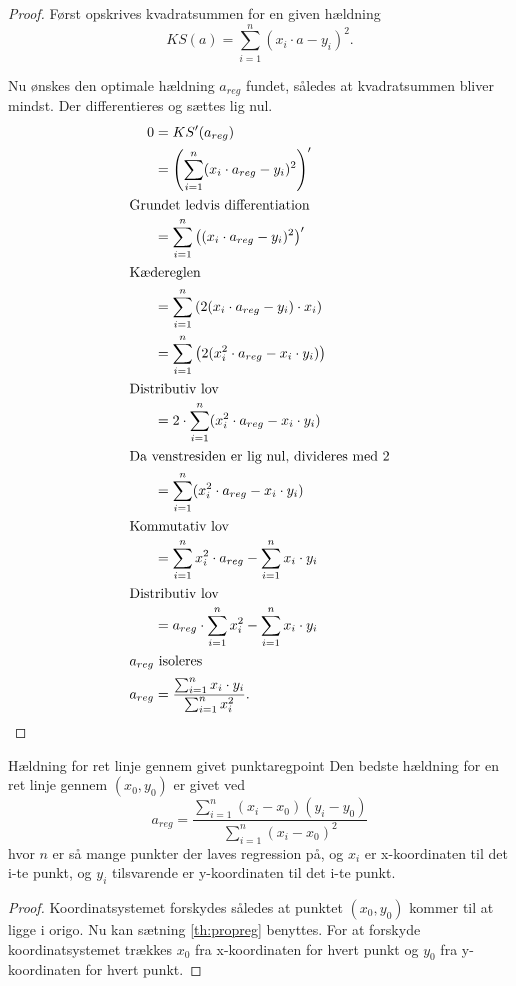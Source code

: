 \documentclass{article}
\begin{document}
\begin{proof}
Først opskrives kvadratsummen for en given hældning
\[
    KS(a) = \sum_{i=1}^n (x_i \cdot a - y_i)^2.
\] 

Nu ønskes den optimale hældning $a_{reg}$ fundet, således at kvadratsummen bliver
mindst. Der differentieres og sættes lig nul.
\begin{align*}
    0 &= KS'(a_{reg}) \\
                 &= \left(\sum_{i=1}^n (x_i \cdot a_{reg} - y_i)^2\right)'\\
\intertext{Grundet ledvis differentiation}
                 &= \sum_{i=1}^n \left((x_i \cdot a_{reg} - y_i)^2\right)'\\
                 \intertext{Kædereglen}
                 &= \sum_{i=1}^n \left(2(x_i \cdot a_{reg} - y_i) \cdot x_i\right)\\
                 &= \sum_{i=1}^n \left(2(x_i^2 \cdot a_{reg} - x_i \cdot y_i)\right)\\
                 \intertext{Distributiv lov}
                 &= 2 \cdot \sum_{i=1}^n (x_i^2 \cdot a_{reg} - x_i \cdot y_i)\\
                 \intertext{Da venstresiden er lig nul, divideres med 2}
                 &= \sum_{i=1}^n (x_i^2 \cdot a_{reg} - x_i \cdot y_i)\\
                 \intertext{Kommutativ lov}
                 &= \sum_{i=1}^n x_i^2 \cdot a_{reg} - \sum_{i=1}^n x_i \cdot y_i\\
                 \intertext{Distributiv lov}
                 &= a_{reg} \cdot \sum_{i=1}^n x_i^2 - \sum_{i=1}^n x_i \cdot y_i\\
                 \intertext{$a_{reg}$ isoleres}
         a_{reg} &=  \frac{\sum_{i=1}^n x_i \cdot y_i}{\sum_{i=1}^n x_i^2}.\qedhere
\end{align*}
\end{proof}

\begin{theorem}{Hældning for ret linje gennem givet punkt}{aregpoint}
    Den bedste hældning for en ret linje gennem $(x_0, y_0)$ er givet ved
    \[
        a_{reg} = \frac{\sum_{i=1}^n (x_i-x_0)(y_i-y_0)}{\sum_{i=1}^n (x_i-x_0)^2}
    \] 
    hvor $n$ er så mange punkter der laves regression på, og $x_i$ er x-koordinaten
    til det i-te punkt, og $y_i$ tilsvarende er y-koordinaten til det i-te punkt.
\end{theorem}

\begin{proof}
Koordinatsystemet forskydes således at punktet $(x_0, y_0)$ kommer til at ligge
i origo. Nu kan sætning \ref{th:propreg} benyttes. For at forskyde
koordinatsystemet trækkes $x_0$ fra x-koordinaten for hvert punkt og $y_0$ fra
y-koordinaten for hvert punkt.
\end{proof}
\end{document}
